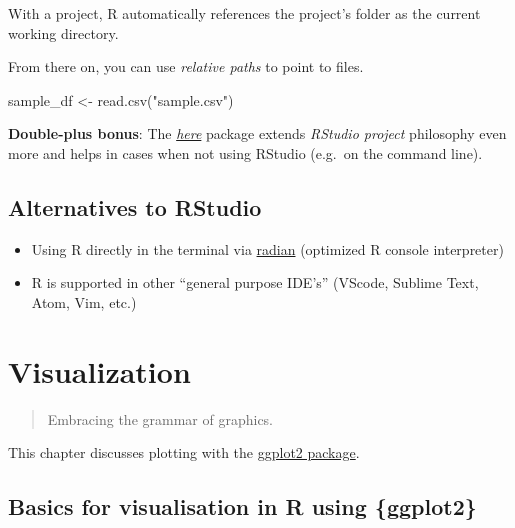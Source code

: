 \documentclass[]{book}
\newenvironment{Shaded}{}{}
\newcommand{\KeywordTok}[1]{\textcolor[rgb]{0.00,0.00,1.00}{#1}}
\newcommand{\NormalTok}[1]{#1}
\newcommand{\StringTok}[1]{\textcolor[rgb]{0.00,0.50,0.50}{#1}}
\begin{document}
With a project, R automatically references the project's folder as the current working directory.

From there on, you can use \emph{relative paths} to point to files.

\begin{Shaded}
\begin{Highlighting}[]
\NormalTok{sample_df <-}\StringTok{ }\KeywordTok{read.csv}\NormalTok{(}\StringTok{"sample.csv"}\NormalTok{)}
\end{Highlighting}
\end{Shaded}

\textbf{Double-plus bonus}: The \href{https://github.com/r-lib/here}{\emph{here}} package extends \emph{RStudio project} philosophy even more and helps in cases when not using RStudio (e.g.~on the command line).

\hypertarget{alternatives-to-rstudio}{%
\section{Alternatives to RStudio}\label{alternatives-to-rstudio}}

\begin{itemize}
\item
  Using R directly in the terminal via \href{https://github.com/randy3k/radian}{radian} (optimized R console interpreter)
\item
  R is supported in other ``general purpose IDE's'' (VScode, Sublime Text, Atom, Vim, etc.)
\end{itemize}

\hypertarget{vis-basics}{%
\chapter{Visualization}\label{vis-basics}}

\begin{quote}
Embracing the grammar of graphics.
\end{quote}

This chapter discusses plotting with the \href{https://ggplot2.tidyverse.org/}{ggplot2 package}.

\hypertarget{basics-for-visualisation-in-r-using-ggplot2}{%
\section{Basics for visualisation in R using \{ggplot2\}}\label{basics-for-visualisation-in-r-using-ggplot2}}
\end{document}
